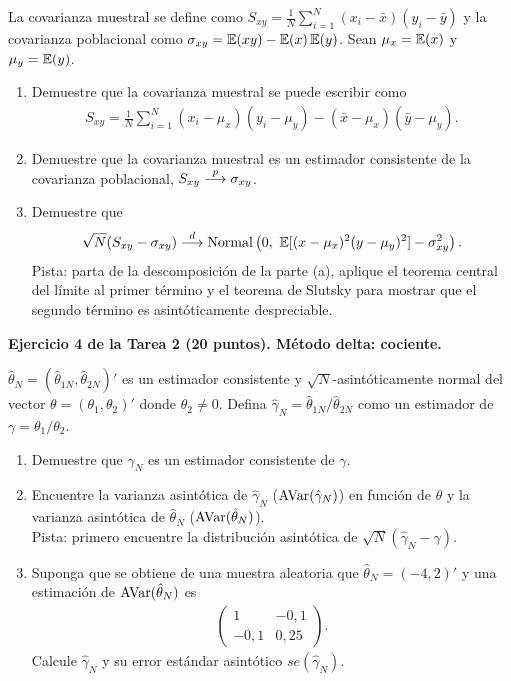 \documentclass[letterpaper,11pt]{article}
\begin{document}
La covarianza muestral se define como
$S_{xy}=\frac{1}{N}\sum_{i=1}^N (x_i-\bar x)(y_i-\bar y)$ y la covarianza poblacional como
$\sigma_{xy}=\operatorname{\mathbb{E}}(xy)-\operatorname{\mathbb{E}}(x)\operatorname{\mathbb{E}}(y)$. Sean $\mu_x=\operatorname{\mathbb{E}}(x)$ y $\mu_y=\operatorname{\mathbb{E}}(y)$.
\begin{enumerate}
    \item Demuestre que la covarianza muestral se puede escribir como
    \begin{align*}
    S_{xy}=\frac{1}{N}\sum_{i=1}^N (x_i-\mu_x)(y_i-\mu_y)-(\bar x-\mu_x)(\bar y-\mu_y).
    \end{align*}
    \item Demuestre que la covarianza muestral es un estimador consistente de la covarianza
    poblacional, $S_{xy}\stackrel{p}{\longrightarrow} \sigma_{xy}$.
    \item Demuestre que
    \begin{align*}
    \sqrt{N}(S_{xy}-\sigma_{xy})\dto \N\left(0,\ \E[(x-\mu_x)^2(y-\mu_y)^2]-\sigma_{xy}^2\right).
    \end{align*}
    Pista: parta de la descomposición de la parte (a), aplique el teorema central del límite al
    primer término y el teorema de Slutsky para mostrar que el segundo término es
    asintóticamente despreciable.
\end{enumerate}

\vspace{1em}

\noindent\textbf{Ejercicio 4 de la Tarea 2 (20 puntos). Método delta: cociente.}

$\hat\theta_N=(\hat\theta_{1N},\hat\theta_{2N})'$ es un estimador consistente y
$\sqrt{N}$-asintóticamente normal del vector $\theta=(\theta_1,\theta_2)'$ donde
$\theta_2\neq 0$. Defina $\hat\gamma_N=\hat\theta_{1N}/\hat\theta_{2N}$ como un estimador de
$\gamma=\theta_1/\theta_2$.
\begin{enumerate}
    \item Demuestre que $\hat\gamma_N$ es un estimador consistente de $\gamma$.
    \item Encuentre la varianza asintótica de $\hat\gamma_N$ ($\operatorname{AVar}(\hat\gamma_N)$) en función
    de $\theta$ y la varianza asintótica de $\hat\theta_N$ ($\operatorname{AVar}(\hat\theta_N)$).\\
    Pista: primero encuentre la distribución asintótica de $\sqrt{N}(\hat\gamma_N-\gamma)$.
    \item Suponga que se obtiene de una muestra aleatoria que $\hat\theta_N=(-4,2)'$ y una
    estimación de $\operatorname{AVar}(\hat\theta_N)$ es
    \begin{align*}
    \begin{pmatrix} 1 & -0{,}1 \\ -0{,}1 & 0{,}25 \end{pmatrix}.
    \end{align*}
    Calcule $\hat\gamma_N$ y su error estándar asintótico $se(\hat\gamma_N)$.
\end{enumerate}
\end{document}
